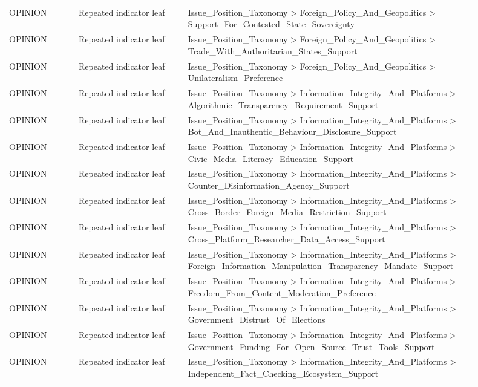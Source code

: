 \begin{table}[htbp]
\begin{threeparttable}
\begin{tabular}{p{0.14\linewidth}p{0.22\linewidth}p{0.54\linewidth}}
OPINION & Repeated indicator leaf & Issue\_Position\_Taxonomy > Foreign\_Policy\_And\_Geopolitics > Support\_For\_Contested\_State\_Sovereignty \\
OPINION & Repeated indicator leaf & Issue\_Position\_Taxonomy > Foreign\_Policy\_And\_Geopolitics > Trade\_With\_Authoritarian\_States\_Support \\
OPINION & Repeated indicator leaf & Issue\_Position\_Taxonomy > Foreign\_Policy\_And\_Geopolitics > Unilateralism\_Preference \\
OPINION & Repeated indicator leaf & Issue\_Position\_Taxonomy > Information\_Integrity\_And\_Platforms > Algorithmic\_Transparency\_Requirement\_Support \\
OPINION & Repeated indicator leaf & Issue\_Position\_Taxonomy > Information\_Integrity\_And\_Platforms > Bot\_And\_Inauthentic\_Behaviour\_Disclosure\_Support \\
OPINION & Repeated indicator leaf & Issue\_Position\_Taxonomy > Information\_Integrity\_And\_Platforms > Civic\_Media\_Literacy\_Education\_Support \\
OPINION & Repeated indicator leaf & Issue\_Position\_Taxonomy > Information\_Integrity\_And\_Platforms > Counter\_Disinformation\_Agency\_Support \\
OPINION & Repeated indicator leaf & Issue\_Position\_Taxonomy > Information\_Integrity\_And\_Platforms > Cross\_Border\_Foreign\_Media\_Restriction\_Support \\
OPINION & Repeated indicator leaf & Issue\_Position\_Taxonomy > Information\_Integrity\_And\_Platforms > Cross\_Platform\_Researcher\_Data\_Access\_Support \\
OPINION & Repeated indicator leaf & Issue\_Position\_Taxonomy > Information\_Integrity\_And\_Platforms > Foreign\_Information\_Manipulation\_Transparency\_Mandate\_Support \\
OPINION & Repeated indicator leaf & Issue\_Position\_Taxonomy > Information\_Integrity\_And\_Platforms > Freedom\_From\_Content\_Moderation\_Preference \\
OPINION & Repeated indicator leaf & Issue\_Position\_Taxonomy > Information\_Integrity\_And\_Platforms > Government\_Distrust\_Of\_Elections \\
OPINION & Repeated indicator leaf & Issue\_Position\_Taxonomy > Information\_Integrity\_And\_Platforms > Government\_Funding\_For\_Open\_Source\_Trust\_Tools\_Support \\
OPINION & Repeated indicator leaf & Issue\_Position\_Taxonomy > Information\_Integrity\_And\_Platforms > Independent\_Fact\_Checking\_Ecosystem\_Support \\

\end{tabular}
\end{threeparttable}
\end{table}
